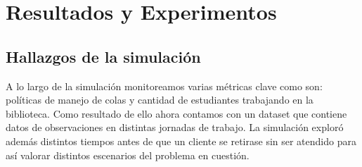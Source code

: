 \documentclass[10pt,twocolumn]{article}
\begin{document}

\section{Resultados y Experimentos}
\subsection{Hallazgos de la simulación}
A lo largo de la simulación monitoreamos varias métricas clave como son: políticas de manejo de colas y cantidad de estudiantes trabajando en la biblioteca. Como resultado de ello ahora contamos con un dataset que contiene datos de observaciones en distintas jornadas de trabajo. La simulación exploró además distintos tiempos antes de que un cliente se retirase sin ser atendido para así valorar distintos escenarios del problema en cuestión.
\end{document}
